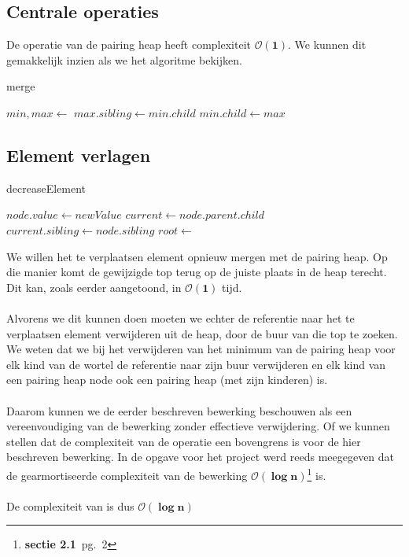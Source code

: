\documentclass[a4paper,12pt]{report}
\newcommand{\bigO}[1]{$\bm{\mathcal{O}(#1)}$} %
\begin{document}
\subsection{Centrale operaties}
De  operatie van de pairing heap heeft complexiteit \bigO{1}. We kunnen dit gemakkelijk inzien als we het algoritme bekijken. \\
\begin{algorithm}[H]
\caption{merge}
\SetAlgoLined	
\DontPrintSemicolon
$min, max \gets$ \;
$max.sibling \gets min.child$\;
$min.child \gets max$\;
\end{algorithm}

\subsection{Element verlagen}
\begin{algorithm}[H]
\caption{decreaseElement}
\SetAlgoLined	
\DontPrintSemicolon
$node.value \gets newValue$\;
$current \gets node.parent.child$\;
$current.sibling \gets node.sibling$\;
$root \gets $\;
\end{algorithm}
We willen het te verplaatsen element opnieuw mergen met de pairing heap. Op die manier komt de gewijzigde top terug op de juiste plaats in de heap terecht. Dit kan, zoals eerder aangetoond, in \bigO{1} tijd. \\ \\
Alvorens we dit kunnen doen moeten we echter de referentie naar het te verplaatsen element verwijderen uit de heap, door de buur van die top te zoeken. We weten dat we bij het verwijderen van het minimum van de pairing heap voor elk kind van de wortel de referentie naar zijn buur verwijderen en elk kind van een pairing heap node ook een pairing heap (met zijn kinderen) is.  \\ \\
Daarom kunnen we de eerder beschreven bewerking beschouwen als een vereenvoudiging van de  bewerking zonder effectieve verwijdering. Of we kunnen stellen dat de complexiteit van de  operatie een bovengrens is voor de hier beschreven bewerking. In de opgave voor het project werd reeds meegegeven dat de gearmortiseerde complexiteit van de  bewerking \bigO{\log n}\footnote{\textbf{sectie 2.1}~pg.~2} is. \\ \\
De complexiteit van  is dus \bigO{\log n}
\end{document}
